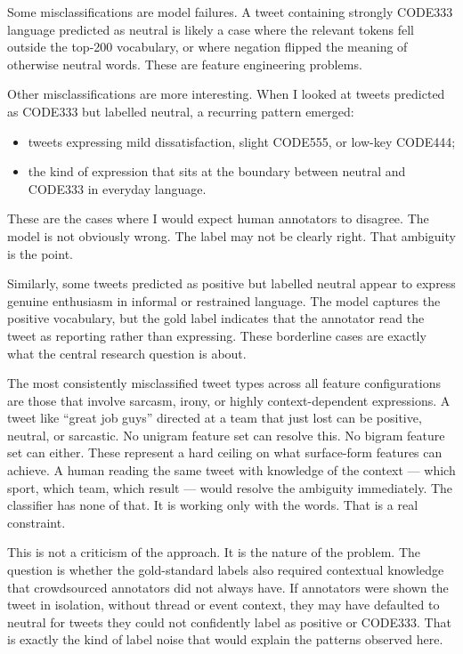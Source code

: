 \documentclass[12pt]{article}
\begin{document}
Some misclassifications are model failures. A tweet containing strongly CODE333 language predicted as neutral is likely a case where the relevant tokens fell outside the top-200 vocabulary, or where negation flipped the meaning of otherwise neutral words. These are feature engineering problems.



Other misclassifications are more interesting. When I looked at tweets predicted as CODE333 but labelled neutral, a recurring pattern emerged:

\begin{itemize}

  \item tweets expressing mild dissatisfaction, slight CODE555, or low-key CODE444;

  \item the kind of expression that sits at the boundary between neutral and CODE333 in everyday language.

\end{itemize} These are the cases where I would expect human annotators to disagree. The model is not obviously wrong. The label may not be clearly right. That ambiguity is the point.



Similarly, some tweets predicted as positive but labelled neutral appear to express genuine enthusiasm in informal or restrained language. The model captures the positive vocabulary, but the gold label indicates that the annotator read the tweet as reporting rather than expressing. These borderline cases are exactly what the central research question is about.



The most consistently misclassified tweet types across all feature configurations are those that involve sarcasm, irony, or highly context-dependent expressions. A tweet like ``great job guys'' directed at a team that just lost can be positive, neutral, or sarcastic. No unigram feature set can resolve this. No bigram feature set can either. These represent a hard ceiling on what surface-form features can achieve. A human reading the same tweet with knowledge of the context --- which sport, which team, which result --- would resolve the ambiguity immediately. The classifier has none of that. It is working only with the words. That is a real constraint.



This is not a criticism of the approach. It is the nature of the problem. The question is whether the gold-standard labels also required contextual knowledge that crowdsourced annotators did not always have. If annotators were shown the tweet in isolation, without thread or event context, they may have defaulted to neutral for tweets they could not confidently label as positive or CODE333. That is exactly the kind of label noise that would explain the patterns observed here.
\end{document}
